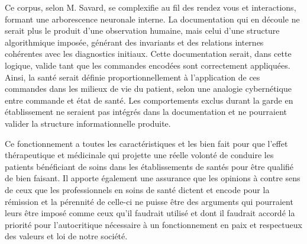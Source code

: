 \documentclass[12pt,a4paper]{article}
\begin{document}
Ce corpus, selon M. Savard, se complexifie au fil des rendez vous et interactions, formant une arborescence neuronale interne. La documentation qui en découle ne serait plus le produit d’une observation humaine, mais celui d’une structure algorithmique imposée, générant des invariants et des relations internes cohérentes avec les diagnostics initiaux. Cette documentation serait, dans cette logique, valide tant que les commandes encodées sont correctement appliquées.
Ainsi, la santé serait définie proportionnellement à l’application de ces commandes dans les milieux de vie du patient, selon une analogie cybernétique entre commande et état de santé. Les comportements exclus durant la garde en établissement ne seraient pas intégrés dans la documentation et ne pourraient valider la structure informationnelle produite.

Ce fonctionnement a toutes les caractéristiques et les bien fait pour que l’effet thérapeutique et médicinale qui projette une réelle volonté de conduire les patients bénéficiant de soins dans les établissements de santés pour être qualifié de bien faisant. Il apporte également une assurance que les opinions à contre sens de ceux que les professionnels en soins de santé dictent et encode pour la rémission et la pérennité de celle-ci ne puisse être des arguments qui pourraient leurs être imposé comme ceux qu’il faudrait utilisé et dont il faudrait accordé la priorité pour l’autocritique nécessaire à un fonctionnement en paix et respectueux des valeurs et loi de notre société.
\end{document}
